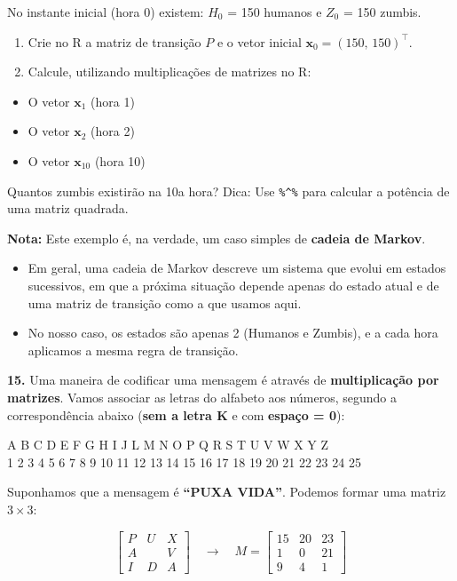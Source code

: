 \documentclass[
]{book}
\providecommand{\tightlist}{%
  \setlength{\itemsep}{0pt}\setlength{\parskip}{0pt}}
\begin{document}
No instante inicial (hora 0) existem: \(H_0\) = 150 humanos e \(Z_0\) = 150 zumbis.

\begin{enumerate}
\def\labelenumi{(\alph{enumi})}
\item
  Crie no R a matriz de transição \(P\) e o vetor inicial \(\mathbf{x}_0 = (150,\,150)^\top\).
\item
  Calcule, utilizando multiplicações de matrizes no R:
\end{enumerate}

\begin{itemize}
\tightlist
\item
  O vetor \(\mathbf{x}_1\) (hora 1)
\item
  O vetor \(\mathbf{x}_2\) (hora 2)
\item
  O vetor \(\mathbf{x}_{10}\) (hora 10)
\end{itemize}

Quantos zumbis existirão na 10a hora? Dica: Use \texttt{\%\^{}\%} para calcular a potência de uma matriz quadrada.

\textbf{Nota:} Este exemplo é, na verdade, um caso simples de \textbf{cadeia de Markov}.

\begin{itemize}
\tightlist
\item
  Em geral, uma cadeia de Markov descreve um sistema que evolui em estados sucessivos, em que a próxima situação depende apenas do estado atual e de uma matriz de transição como a que usamos aqui.
\item
  No nosso caso, os estados são apenas 2 (Humanos e Zumbis), e a cada hora aplicamos a mesma regra de transição.
\end{itemize}

\textbf{15.} Uma maneira de codificar uma mensagem é através de \textbf{multiplicação por matrizes}. Vamos associar as letras do alfabeto aos números, segundo a correspondência abaixo
(\textbf{sem a letra K} e com \textbf{espaço = 0}):

A B C D E F G H I J L M N O P Q R S T U V W X Y Z\\
1 2 3 4 5 6 7 8 9 10 11 12 13 14 15 16 17 18 19 20 21 22 23 24 25

Suponhamos que a mensagem é \textbf{``PUXA VIDA''}. Podemos formar uma matriz \(3\times3\):

\[
\begin{bmatrix}
P & U & X \\
A & \ \,& V \\
I & D & A
\end{bmatrix}
\quad\longrightarrow\quad
M=
\begin{bmatrix}
15 & 20 & 23\\
1  & 0  & 21\\
9  & 4  & 1
\end{bmatrix}
\]
\end{document}
